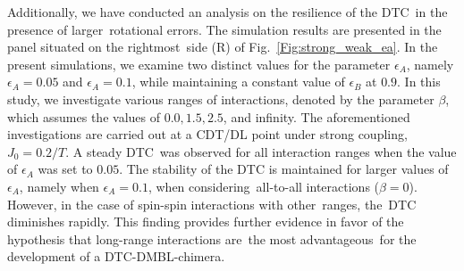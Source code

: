 \documentclass[
nofootinbib,
reprint,
superscriptaddress,
amsmath,amssymb,showkeys,
aps,
prb,
]{revtex4-2}
\begin{document}
	Additionally, we have conducted an analysis on the resilience of the DTC in the presence of larger rotational errors. The simulation results are presented in the panel situated on the rightmost side (R) of Fig.~\ref{Fig:strong_weak_ea}. In the present simulations, we examine two distinct values for the parameter $\epsilon_A$, namely $\epsilon_A = 0.05$ and $\epsilon_A = 0.1$, while maintaining a constant value of $\epsilon_B$ at $0.9$. In this study, we investigate various ranges of interactions, denoted by the parameter $\beta$, which assumes the values of $0.0, 1.5, 2.5$, and infinity. The aforementioned investigations are carried out at a CDT/DL point under strong coupling, $J_0 = 0.2/T$.  A steady DTC was observed for all interaction ranges when the value of $\epsilon_A$ was set to $0.05$. The stability of the DTC is maintained for larger values of $\epsilon_A$, namely when $\epsilon_A = 0.1$, when considering all-to-all interactions ($\beta=0$). However, in the case of spin-spin interactions with other ranges, the DTC diminishes rapidly. This finding provides further evidence in favor of the hypothesis that long-range interactions are the most advantageous for the development of a DTC-DMBL-chimera.
	
\end{document}
